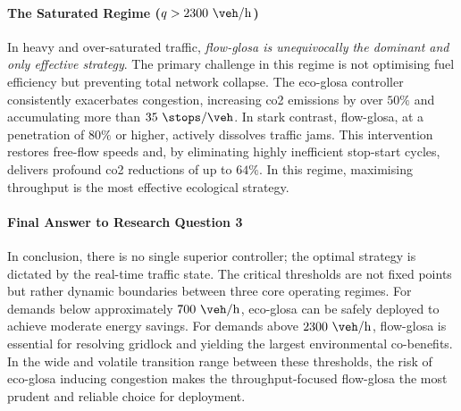 \paragraph{The Saturated Regime ($q > 2300~\unit{\veh\per\hour}$)}
In heavy and over-saturated traffic, \textit{\ac{flow-glosa} is unequivocally the dominant and only effective strategy}. The primary challenge in this regime is not optimising fuel efficiency but preventing total network collapse. The \ac{eco-glosa} controller consistently exacerbates congestion, increasing \ac{co2} emissions by over $50\%$ and accumulating more than $35~\unit{\stops\per\veh}$. In stark contrast, \ac{flow-glosa}, at a penetration of $80\%$ or higher, actively dissolves traffic jams. This intervention restores free-flow speeds and, by eliminating highly inefficient stop-start cycles, delivers profound \ac{co2} reductions of up to $64\%$. In this regime, maximising throughput is the most effective ecological strategy.

\paragraph{Final Answer to Research Question 3}
In conclusion, there is no single superior controller; the optimal strategy is dictated by the real-time traffic state. The critical thresholds are not fixed points but rather dynamic boundaries between three core operating regimes. For demands below approximately $700~\unit{\veh\per\hour}$, \ac{eco-glosa} can be safely deployed to achieve moderate energy savings. For demands above $2300~\unit{\veh\per\hour}$, \ac{flow-glosa} is essential for resolving gridlock and yielding the largest environmental co-benefits. In the wide and volatile transition range between these thresholds, the risk of \ac{eco-glosa} inducing congestion makes the throughput-focused \ac{flow-glosa} the most prudent and reliable choice for deployment.

